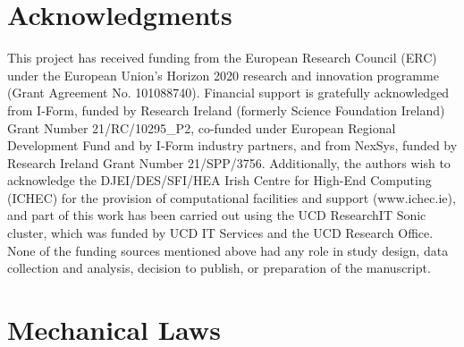 \documentclass[review,3p]{elsarticle}
\begin{document}
\section*{Acknowledgments}
%
This project has received funding from the European Research Council (ERC) under the European Union’s Horizon 2020 research and innovation programme (Grant Agreement No. 101088740).
Financial support is gratefully acknowledged from I-Form, funded by Research Ireland (formerly Science Foundation Ireland)
Grant Number {21/RC/10295\_P2}, co-funded under European Regional Development Fund and by I-Form industry partners, and from NexSys, funded by Research Ireland Grant Number 21/SPP/3756.
Additionally, the authors wish to acknowledge the DJEI/DES/SFI/HEA Irish Centre for High-End Computing (ICHEC) for the provision of computational facilities and support (www.ichec.ie), and part of this work has been carried out using the UCD ResearchIT Sonic cluster, which was funded by UCD IT Services and the UCD Research Office. None of the funding sources mentioned above had any role in study design, data collection and analysis, decision to publish, or preparation of the manuscript.
%



\appendix

\setcounter{table}{0}
\setcounter{figure}{0}
\setcounter{subfigure}{0}

\renewcommand{\thetable}{\Alph{section}.\arabic{table}}
\renewcommand{\thefigure}{\Alph{section}.\arabic{figure}}

\renewcommand{\thesubfigure}{(\alph{subfigure})}

\makeatletter
\renewcommand{\p@subfigure}{\thefigure}
\makeatother

\renewcommand{\theHtable}{\Alph{section}.\arabic{table}}
\renewcommand{\theHfigure}{\Alph{section}.\arabic{figure}}
\renewcommand{\theHsubfigure}{\Alph{section}.\arabic{figure}.\alph{subfigure}}

%
%
\section{Mechanical Laws}
\label{app:mechLaws}
%
%
\end{document}
